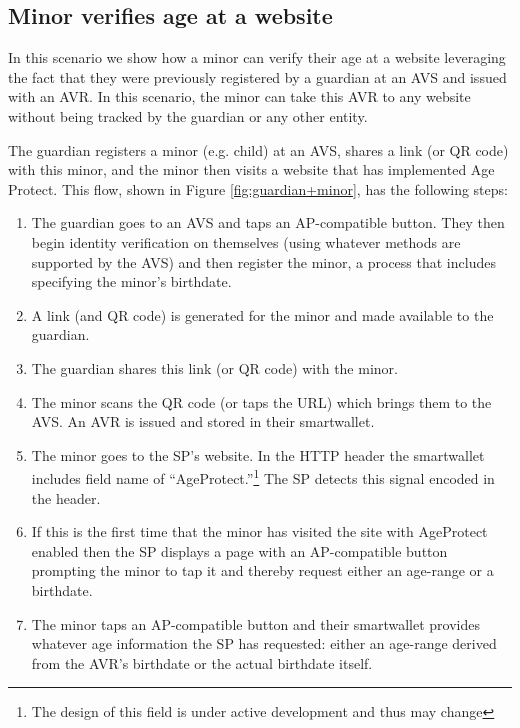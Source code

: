 \documentclass[11pt, oneside]{article}   	%
\begin{document}
\subsection{Minor verifies age at a website}

In this scenario we show how a minor can verify their age at a website leveraging the fact that they were previously registered by a guardian at an AVS and issued with an AVR. In this scenario, the minor can take this AVR to any website without being tracked by the guardian or any other entity. 

The guardian registers a minor (e.g. child) at an AVS, shares a link (or QR code) with this minor, and the minor then visits a website that has implemented Age Protect. This flow, shown in Figure \ref{fig:guardian+minor}, has the following steps:
\begin{enumerate}
	\item The guardian goes to an AVS and taps an AP-compatible button. They then begin identity verification on themselves (using whatever methods are supported by the AVS) and then register the minor, a process that includes specifying the minor's birthdate.
	\item A link (and QR code) is generated for the minor and made available to the guardian.
	\item The guardian shares this link (or QR code) with the minor.
	\item The minor scans the QR code (or taps the URL) which brings them to the AVS. An AVR is issued and stored in their smartwallet.
	\item The minor goes to the SP's website. In the HTTP header the smartwallet includes field name of ``AgeProtect.''\footnote{The design of this field is under active development and thus may change} The SP detects this signal encoded in the header.
	\item If this is the first time that the minor has visited the site with AgeProtect enabled then the SP displays a page with an AP-compatible button prompting the minor to tap it and thereby request either an age-range or a birthdate.
	\item The minor taps an AP-compatible button and their smartwallet provides whatever age information the SP has requested: either an age-range derived from the AVR's birthdate or the actual birthdate itself.
\end{enumerate}
\end{document}
